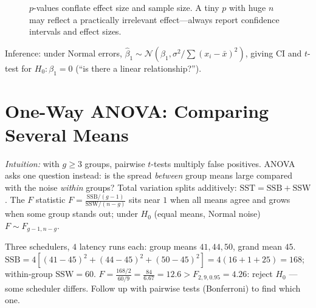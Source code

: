 \begin{figure}[h]
\centering
{}
\caption{$p$-values conflate effect size and sample size. A tiny $p$ with huge $n$ may reflect a practically irrelevant effect---always report confidence intervals and effect sizes.}
\label{fig:pvalue-effect}
\end{figure}

Inference: under Normal errors, $\hat\beta_1\sim\mathcal{N}(\beta_1,\sigma^2/\sum(x_i-\bar x)^2)$, giving CI and $t$-test for $H_0:\beta_1=0$ (``is there a linear relationship?'').

\section{One-Way ANOVA: Comparing Several Means}
\label{sec:anova}
\emph{Intuition:} with $g\ge3$ groups, pairwise $t$-tests multiply false positives. ANOVA asks one question instead: is the spread \emph{between} group means large compared with the noise \emph{within} groups? Total variation splits additively: $\mathrm{SST}=\mathrm{SSB}+\mathrm{SSW}$. The $F$ statistic $F=\frac{\mathrm{SSB}/(g-1)}{\mathrm{SSW}/(n-g)}$ sits near $1$ when all means agree and grows when some group stands out; under $H_0$ (equal means, Normal noise) $F\sim F_{g-1,n-g}$.
\begin{example}[Worked] Three schedulers, $4$ latency runs each: group means $41,44,50$, grand mean $45$. $\mathrm{SSB}=4[(41-45)^2+(44-45)^2+(50-45)^2]=4(16+1+25)=168$; within-group $\mathrm{SSW}=60$. $F=\frac{168/2}{60/9}=\frac{84}{6.67}=12.6>F_{2,9,0.95}=4.26$: reject $H_0$ --- some scheduler differs. Follow up with pairwise tests (Bonferroni) to find which one.
\end{example}

